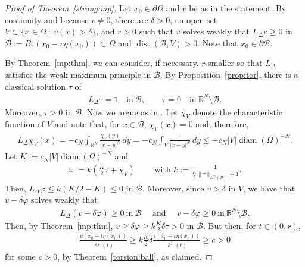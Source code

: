 \documentclass[11pt]{article}
\numberwithin{equation}{section}
\begin{document}
\begin{proof}[Proof of Theorem~\ref{strong:mp}]
Let $x_0\in\partial \Omega$ and $v$ be as in the statement. By continuity and because $v\neq 0$, there are $\delta>0$, an open set $V\subset\{x\in\Omega~:~v(x)>\delta\}$, and $r>0$ such that $v$ solves weakly that $L_\Delta v\geq 0$ in $\mathcal B:=B_{r}(x_{0}-r\eta(x_0))\subset \Omega$ and $\operatorname{dist}(\mathcal B,V)>0.$  Note that $x_0\in\partial \mathcal B$.

By Theorem~\ref{mp:thm}, we can consider, if necessary, $r$ smaller so that $L_{\Delta}$ satisfies the weak maximum principle in $\mathcal B$. By Proposition~\ref{prop:tor}, there is a classical solution $\tau$ of
%
\begin{align*}
L_{\Delta}\tau=1\quad\mbox{in}~\mathcal B,\qquad 
\tau=0\quad\mbox{in}~\mathbb{R}^{N}\setminus \mathcal B.
\end{align*}
%
Moreover, $\tau>0$ in $\mathcal B$. Now we argue as in \cite{JF}. Let $\chi_{V}$ denote the characteristic function of $V$ and note that, for $x\in \mathcal B$, $\chi_{V}(x)=0$ and, therefore, 
\begin{align*}
L_{\Delta}\chi_{V}(x)=-c_{N}\int_{\mathbb{R}^{N}}\frac{\chi_{V}(y)}{|x-y|^{N}}\, dy=-c_{N}\int_{V}\frac{1}{|x-y|^{N}}\, dy\leq -c_{N}|V|\operatorname{diam}(\Omega)^{-N}.
\end{align*}
Let $K:=c_{N}|V|\operatorname{diam}(\Omega)^{-N}$ and 
\begin{align*}
\varphi:=k\left(\frac{K}{2}\tau+\chi_{V}\right)\qquad \text{ with }k:=\frac{1}{\frac{K}{2}\|\tau\|_{L^\infty(\mathcal B)}+1}.    
\end{align*}
Then, $L_{\Delta}\varphi\leq k(K/2-K)\leq 0$ in $\mathcal B$. Moreover, since $v>\delta$ in $V$, we have that $v-\delta\varphi$ solves weakly that
\begin{align*}
L_{\Delta}(v-\delta\varphi)\geq 0~\mbox{in}~\mathcal B\quad \text{ and }\quad 
v-\delta\varphi\geq 0~\mbox{in}~\mathbb{R}^{N}\setminus \mathcal B.
\end{align*}
Then, by Theorem~\ref{mp:thm}, $v\geq\delta\varphi\geq k\frac{K}{2}\delta\tau>0$ in $\mathcal B$. But then, for $t\in(0,r)$,
\begin{align*}
\frac{v(x_0-t\eta(x_0))}{\ell^\frac{1}{2}(t)}
\geq k\frac{K}{2} \delta\frac{\tau(x_0-t\eta(x_0))}{\ell^\frac{1}{2}(t)}
\geq c>0
\end{align*}
for some $c>0$, by Theorem~\ref{torsion:ball}, as claimed. 
\end{proof}
\end{document}
